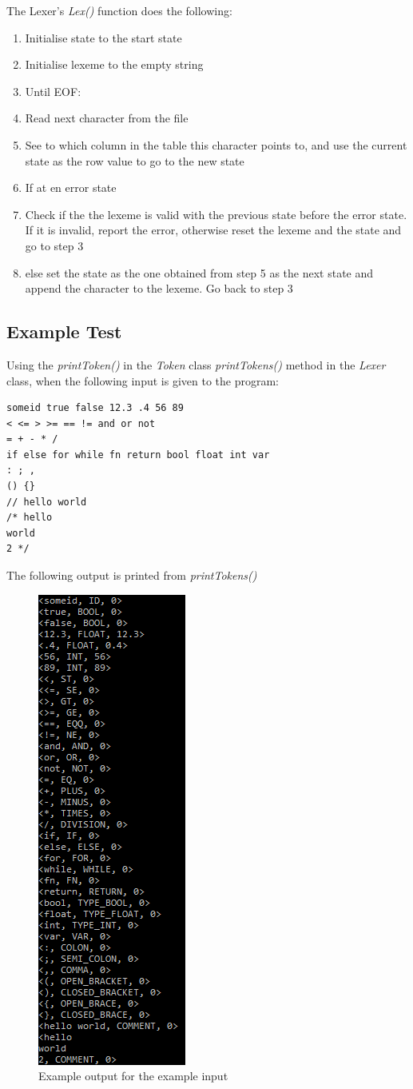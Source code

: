 The Lexer's \textit{Lex()} function does the following:
\begin{enumerate}
	\item Initialise state to the start state
	\item Initialise lexeme to the empty string
	\item Until EOF:
	\item \quad Read next character from the file
	\item \quad See to which column in the table this character points to, and use the current state as the row value to go to the new state
	\item \quad If at en error state
	\item \quad \quad Check if the the lexeme is valid with the previous state before the error state. If it is invalid, report the error, otherwise reset the lexeme and the state and go to step 3
	\item \quad else set the state as the one obtained from step 5 as the next state and append the character to the lexeme. Go back to step 3
\end{enumerate}

\subsection{Example Test}
Using the \textit{printToken()} in the \textit{Token} class \textit{printTokens()} method in the \textit{Lexer} class, when the following input is given to the program:
\begin{lstlisting}
someid true false 12.3 .4 56 89
< <= > >= == != and or not
= + - * /
if else for while fn return bool float int var
: ; ,
() {}
// hello world
/* hello 
world
2 */
\end{lstlisting}
The following output is printed from \textit{printTokens()}

\begin{figure}[H]
	\centering
	\includegraphics[scale=1]{Images/Q1_ExampleTest.png}
	\caption{Example output for the example input}
\end{figure}

